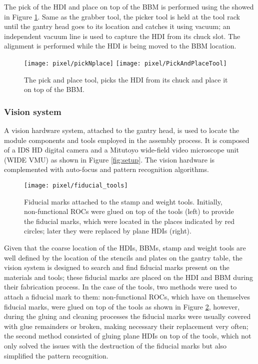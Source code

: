 The pick of the HDI and place on top of the BBM is performed using the  showed in Figure \ref{fig:pandp_tool}. Same as the grabber tool, the picker tool is held at the tool rack until the gantry head goes to its location and catches it using vacuum; an independent vacuum line is used to capture the HDI from its chuck slot. The alignment is performed while the HDI is being moved to the BBM location.      
\begin{figure}[!h]
  \centering  
  \texttt{[image: pixel/pickNplace]}
  \texttt{[image: pixel/PickAndPlaceTool]}
  \caption[Pick and place tool.]{The pick and place tool, picks the HDI from its chuck and place it on top of the BBM.}\label{fig:pandp_tool}
\end{figure}

\subsubsection*{Vision system}

A vision hardware system, attached to the gantry head, is used to locate the module components and tools employed in the assembly process. It is composed of a IDS HD digital camera and a Mitutoyo wide-field video microscope unit (WIDE VMU) as shown in Figure \ref{fig:setup}. The vision hardware is complemented with auto-focus and pattern recognition algorithms. 

\begin{figure}[!h]
  \centering  
  \texttt{[image: pixel/fiducial\_tools]}\\
  \caption[Fiducial marks on tools.]{Fiducial marks attached to the stamp and weight tools. Initially, non-functional ROCs were glued on top of the tools (left) to provide the fiducial marks, which were located in the places indicated by red circles; later they were replaced by plane HDIs (right).}\label{fig:fiducial_tools}
\end{figure}

Given that the coarse location of the HDIs, BBMs, stamp and weight tools are well defined by the location of the stencils and plates on the gantry table, the vision system is designed to search and find fiducial marks present on the materials and tools; these fiducial marks are placed on the HDI and BBM during their fabrication process. In the case of the tools, two methods were used to attach a fiducial mark to them: non-functional ROCs, which have on themselves fiducial marks, were glued on top of the tools as shown in Figure \ref{fig:fiducial_tools}, however, during the gluing and cleaning processes the fiducial marks were usually covered with glue remainders or broken, making necessary their replacement very often; the second method consisted of gluing plane HDIs on top of the tools, which not only solved the issues with the destruction of the fiducial marks but also simplified the pattern recognition.

